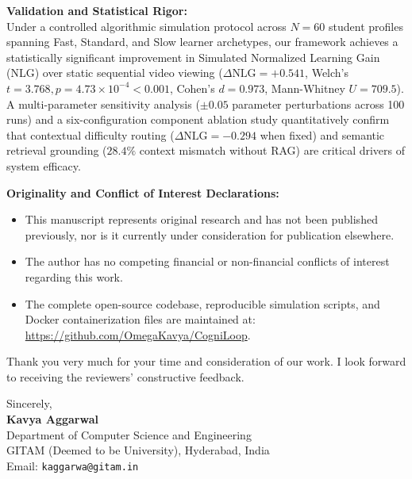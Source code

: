 \documentclass[11pt]{article}
\begin{document}
\vspace{0.8em}
\noindent
\textbf{Validation and Statistical Rigor:} \\
Under a controlled algorithmic simulation protocol across $N=60$ student profiles spanning Fast, Standard, and Slow learner archetypes, our framework achieves a statistically significant improvement in Simulated Normalized Learning Gain (NLG) over static sequential video viewing ($\Delta \text{NLG} = +0.541$, Welch's $t = 3.768, p = 4.73 \times 10^{-4} < 0.001$, Cohen's $d = 0.973$, Mann-Whitney $U = 709.5$). A multi-parameter sensitivity analysis ($\pm 0.05$ parameter perturbations across 100 runs) and a six-configuration component ablation study quantitatively confirm that contextual difficulty routing ($\Delta \text{NLG} = -0.294$ when fixed) and semantic retrieval grounding ($28.4\%$ context mismatch without RAG) are critical drivers of system efficacy.

\vspace{0.8em}
\noindent
\textbf{Originality and Conflict of Interest Declarations:}
\begin{itemize}
    \item This manuscript represents original research and has not been published previously, nor is it currently under consideration for publication elsewhere.
    \item The author has no competing financial or non-financial conflicts of interest regarding this work.
    \item The complete open-source codebase, reproducible simulation scripts, and Docker containerization files are maintained at: \url{https://github.com/OmegaKavya/CogniLoop}.
\end{itemize}

\vspace{1.0em}
\noindent
Thank you very much for your time and consideration of our work. I look forward to receiving the reviewers' constructive feedback.

\vspace{1.8em}
\noindent
Sincerely, \\[1.5em]
\textbf{Kavya Aggarwal} \\
Department of Computer Science and Engineering \\
GITAM (Deemed to be University), Hyderabad, India \\
Email: \texttt{kaggarwa@gitam.in}
\end{document}
